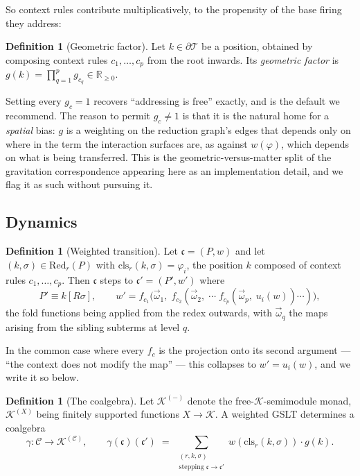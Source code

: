 \documentclass[11pt,a4paper]{article}
\theoremstyle{plain}
\theoremstyle{definition}
\newtheorem{definition}[theorem]{Definition}
\theoremstyle{remark}
\newcommand{\Rnn}{\mathbb{R}_{\geq 0}}
\newcommand{\Terms}{\mathcal{T}}
\newcommand{\Cfg}{\mathcal{C}}
\newcommand{\Red}{\mathrm{Red}}
\newcommand{\wmap}{w}
\newcommand{\gfac}{g}
\newcommand{\class}{\mathrm{cls}}
\begin{document}
So context rules contribute multiplicatively, to the propensity of the base firing they address:

\begin{definition}[Geometric factor]
\label{def:gfac}
Let $k \in \partial\Terms$ be a position, obtained by composing context rules $c_1, \ldots, c_p$
from the root inwards. Its \emph{geometric factor} is
$\gfac(k) = \prod_{q=1}^{p} \gfac_{c_q} \in \Rnn$.
\end{definition}

Setting every $\gfac_c = 1$ recovers ``addressing is free'' exactly, and is the default we recommend.
The reason to permit $\gfac_c \neq 1$ is that it is the natural home for a \emph{spatial} bias:
$\gfac$ is a weighting on the reduction graph's edges that depends only on where in the term the
interaction surfaces are, as against $\wmap(\varphi)$, which depends on what is being transferred.
This is the geometric-versus-matter split of the gravitation correspondence \cite{costspacetime}
appearing here as an implementation detail, and we flag it as such without pursuing it.

\subsection{Dynamics}
\label{sec:dynamic}

\begin{definition}[Weighted transition]
\label{def:transition}
Let $\mathfrak{c} = (P, \wmap)$ and let $(k,\sigma) \in \Red_r(P)$ with
$\class_r(k,\sigma) = \varphi_i$, the position $k$ composed of context rules $c_1, \ldots, c_p$.
Then $\mathfrak{c}$ steps to $\mathfrak{c}' = (P', \wmap')$ where
\[
P' \equiv k[R\sigma],
\qquad
\wmap' = f_{c_1}\!\big(\vec{\omega}_1,\; f_{c_2}(\vec{\omega}_2, \;\cdots\; f_{c_p}(\vec{\omega}_p,\; u_i(\wmap))\cdots)\big),
\]
the fold functions being applied from the redex outwards, with $\vec{\omega}_q$ the maps arising
from the sibling subterms at level $q$.
\end{definition}

In the common case where every $f_c$ is the projection onto its second argument --- ``the context
does not modify the map'' --- this collapses to $\wmap' = u_i(\wmap)$, and we write it so below.

\begin{definition}[The coalgebra]
\label{def:coalgebra}
Let $\mathcal{K}^{(-)}$ denote the free-$\mathcal{K}$-semimodule monad, $\mathcal{K}^{(X)}$ being
finitely supported functions $X \to \mathcal{K}$. A weighted GSLT determines a coalgebra
\[
\gamma : \Cfg \longrightarrow \mathcal{K}^{(\Cfg)},
\qquad
\gamma(\mathfrak{c})(\mathfrak{c}') \;=\; \sum_{\substack{(r,k,\sigma) \\ \text{stepping } \mathfrak{c} \to \mathfrak{c}'}} \wmap(\class_r(k,\sigma)) \cdot \gfac(k).
\]
\end{definition}
\end{document}
